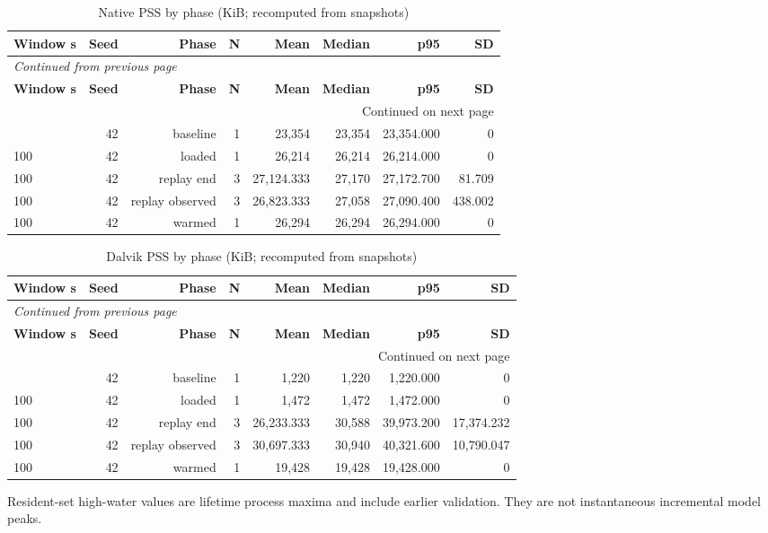 \documentclass[10pt,a4paper]{article}
\begin{document}
\begingroup\small\setlength{\tabcolsep}{4pt}\renewcommand{\arraystretch}{1.12}
\begin{longtable}{@{}lrrrrrrr@{}}
\caption{Native PSS by phase (KiB; recomputed from snapshots)}\\
\toprule
\textbf{Window s} & \textbf{Seed} & \textbf{Phase} & \textbf{N} & \textbf{Mean} & \textbf{Median} & \textbf{p95} & \textbf{SD} \\
\midrule\endfirsthead
\multicolumn{8}{l}{\small\itshape Continued from previous page}\\
\toprule
\textbf{Window s} & \textbf{Seed} & \textbf{Phase} & \textbf{N} & \textbf{Mean} & \textbf{Median} & \textbf{p95} & \textbf{SD} \\
\midrule\endhead
\midrule\multicolumn{8}{r}{\small Continued on next page}\\\endfoot
\bottomrule\endlastfoot
100 & 42 & baseline & 1 & 23,354 & 23,354 & 23,354.000 & 0 \\
100 & 42 & loaded & 1 & 26,214 & 26,214 & 26,214.000 & 0 \\
100 & 42 & replay end & 3 & 27,124.333 & 27,170 & 27,172.700 & 81.709 \\
100 & 42 & replay observed & 3 & 26,823.333 & 27,058 & 27,090.400 & 438.002 \\
100 & 42 & warmed & 1 & 26,294 & 26,294 & 26,294.000 & 0 \\
\end{longtable}\endgroup
\begingroup\small\setlength{\tabcolsep}{4pt}\renewcommand{\arraystretch}{1.12}
\begin{longtable}{@{}lrrrrrrr@{}}
\caption{Dalvik PSS by phase (KiB; recomputed from snapshots)}\\
\toprule
\textbf{Window s} & \textbf{Seed} & \textbf{Phase} & \textbf{N} & \textbf{Mean} & \textbf{Median} & \textbf{p95} & \textbf{SD} \\
\midrule\endfirsthead
\multicolumn{8}{l}{\small\itshape Continued from previous page}\\
\toprule
\textbf{Window s} & \textbf{Seed} & \textbf{Phase} & \textbf{N} & \textbf{Mean} & \textbf{Median} & \textbf{p95} & \textbf{SD} \\
\midrule\endhead
\midrule\multicolumn{8}{r}{\small Continued on next page}\\\endfoot
\bottomrule\endlastfoot
100 & 42 & baseline & 1 & 1,220 & 1,220 & 1,220.000 & 0 \\
100 & 42 & loaded & 1 & 1,472 & 1,472 & 1,472.000 & 0 \\
100 & 42 & replay end & 3 & 26,233.333 & 30,588 & 39,973.200 & 17,374.232 \\
100 & 42 & replay observed & 3 & 30,697.333 & 30,940 & 40,321.600 & 10,790.047 \\
100 & 42 & warmed & 1 & 19,428 & 19,428 & 19,428.000 & 0 \\
\end{longtable}\endgroup
Resident-set high-water values are lifetime process maxima and include earlier validation. They are not instantaneous incremental model peaks.
\end{document}
